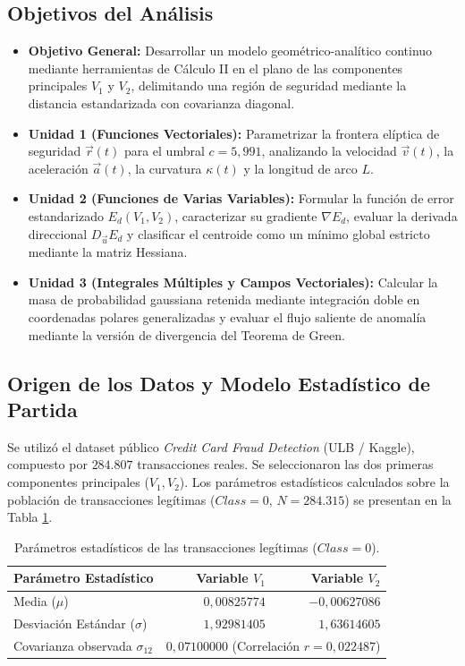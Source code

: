 \documentclass[12pt,a4paper]{article}
\begin{document}
\subsection{Objetivos del Análisis}
\begin{itemize}
    \item \textbf{Objetivo General:} Desarrollar un modelo geométrico-analítico continuo mediante herramientas de Cálculo II en el plano de las componentes principales $V_1$ y $V_2$, delimitando una región de seguridad mediante la distancia estandarizada con covarianza diagonal.
    \item \textbf{Unidad 1 (Funciones Vectoriales):} Parametrizar la frontera elíptica de seguridad $\vec{r}(t)$ para el umbral $c = 5{,}991$, analizando la velocidad $\vec{v}(t)$, la aceleración $\vec{a}(t)$, la curvatura $\kappa(t)$ y la longitud de arco $L$.
    \item \textbf{Unidad 2 (Funciones de Varias Variables):} Formular la función de error estandarizado $E_d(V_1, V_2)$, caracterizar su gradiente $\nabla E_d$, evaluar la derivada direccional $D_{\vec{u}} E_d$ y clasificar el centroide como un mínimo global estricto mediante la matriz Hessiana.
    \item \textbf{Unidad 3 (Integrales Múltiples y Campos Vectoriales):} Calcular la masa de probabilidad gaussiana retenida mediante integración doble en coordenadas polares generalizadas y evaluar el flujo saliente de anomalía mediante la versión de divergencia del Teorema de Green.
\end{itemize}

\subsection{Origen de los Datos y Modelo Estadístico de Partida}
Se utilizó el dataset público \textit{Credit Card Fraud Detection} (ULB / Kaggle), compuesto por $284.807$ transacciones reales. Se seleccionaron las dos primeras componentes principales ($V_1, V_2$). Los parámetros estadísticos calculados sobre la población de transacciones legítimas ($Class = 0$, $N = 284.315$) se presentan en la Tabla \ref{tab:estadisticos}.

\begin{table}[H]
\centering
\caption{Parámetros estadísticos de las transacciones legítimas ($Class = 0$).}
\label{tab:estadisticos}
\begin{tabular}{lrr}
\toprule
\textbf{Parámetro Estadístico} & \textbf{Variable $V_1$} & \textbf{Variable $V_2$} \\
\midrule
Media ($\mu$) & $0{,}00825774$ & $-0{,}00627086$ \\
Desviación Estándar ($\sigma$) & $1{,}92981405$ & $1{,}63614605$ \\
Covarianza observada $\sigma_{12}$ & \multicolumn{2}{c}{$0{,}07100000$ (Correlación $r = 0{,}022487$)} \\
\bottomrule
\end{tabular}
\end{table}
\end{document}
